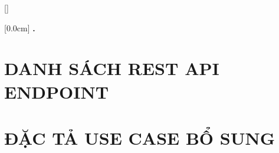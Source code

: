 \documentclass[a4paper,13pt,3p,twoside]{report}
\renewcommand{\bibname}{Danh_sach_tai_lieu_tham_khao}
\theoremstyle{definition}
\begin{document}
\newpage
\renewcommand\bibname{TÀI LIỆU THAM KHẢO}
\printbibliography
{}

\appendixpage
\appendices
\addappheadtotoc


{}[]
\titlespacing*{\chapter}{0pt}{-20pt}{20pt}

    [0.0cm]             %
    {\bfseries\vspace{0.3cm}}                  %
    {{\bfseries{\scshape} \thecontentslabel.\ }} %
    {}         %
    {\contentspage}         %
\chapter{DANH SÁCH REST API ENDPOINT}

\newpage
\chapter{ĐẶC TẢ USE CASE BỔ SUNG}

\end{document}
